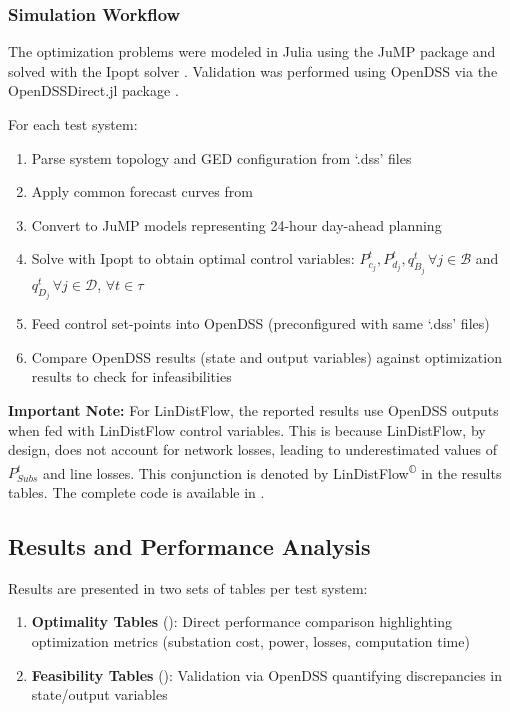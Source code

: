 \subsubsection{Simulation Workflow}

The optimization problems were modeled in Julia using the JuMP package \cite{Lubin2023} and solved with the Ipopt solver \cite{ipopt-solver-Wachter2006Mar}. Validation was performed using OpenDSS via the OpenDSSDirect.jl package \cite{OpenDSSDirect-jl}.

For each test system:
\begin{enumerate}
    \item Parse system topology and GED configuration from `.dss' files
    \item Apply common forecast curves from 
    \item Convert to JuMP models representing 24-hour day-ahead planning
    \item Solve with Ipopt to obtain optimal control variables: \(P_{c_j}^t, P_{d_j}^t, q_{B_j}^t \, \forall j \in \mathcal{B}\) and \(q_{D_j}^t \, \forall j \in \mathcal{D}\), \(\forall t \in \tau\)
    \item Feed control set-points into OpenDSS (preconfigured with same `.dss' files)
    \item Compare OpenDSS results (state and output variables) against optimization results to check for infeasibilities
\end{enumerate}

\textbf{Important Note:} For LinDistFlow, the reported results use OpenDSS outputs when fed with LinDistFlow control variables. This is because LinDistFlow, by design, does not account for network losses, leading to underestimated values of \(P_{Subs}^t\) and line losses. This conjunction is denoted by LinDistFlow\textsuperscript{\(\mathbb{O}\)} in the results tables. The complete code is available in \cite{MPOPFRepo}.

\subsection{Results and Performance Analysis}

Results are presented in two sets of tables per test system:
\begin{enumerate}
    \item \textbf{Optimality Tables} (): Direct performance comparison highlighting optimization metrics (substation cost, power, losses, computation time)
    \item \textbf{Feasibility Tables} (): Validation via OpenDSS quantifying discrepancies in state/output variables
\end{enumerate}

